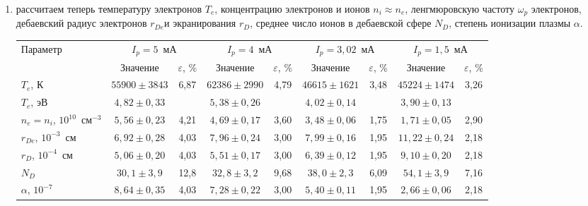 \documentclass[a4paper]{article}
\begin{document}
\begin{enumerate}
\item рассчитаем теперь температуру электронов $T_e$, концентрацию электронов и ионов $n_i \approx n_e$, ленгмюровскую частоту $\omega_p$ электронов, дебаевский радиус электронов $r_{De}$и экранирования $r_D$, среднее число ионов в дебаевской сфере $N_D$, степень ионизации плазмы $\alpha$.

\begin{table}[h!]
\centering

\label{tab:plasma_params}
\begin{tabular}{|l|c|c|c|c|c|c|c|c|}
\hline
\multirow{2}{*}{Параметр} & 
\multicolumn{2}{c|}{$I_p = 5$~мА} & 
\multicolumn{2}{c|}{$I_p = 4$~мА} & 
\multicolumn{2}{c|}{$I_p = 3,02$~мА} & 
\multicolumn{2}{c|}{$I_p = 1,5$~мА} \\
\cline{2-9}
& Значение & $\varepsilon$, \% & Значение & $\varepsilon$, \% & Значение & $\varepsilon$, \% & Значение & $\varepsilon$, \% \\
\hline

\multirow{2}{*}{$T_e$, К} & \multirow{2}{*}{$55900 \pm 3843$} & \multirow{2}{*}{6,87} & \multirow{2}{*}{$62386 \pm 2990$} & \multirow{2}{*}{4,79} & \multirow{2}{*}{$46615 \pm 1621$} & \multirow{2}{*}{3,48} & \multirow{2}{*}{$45224 \pm 1474$} & \multirow{2}{*}{3,26} \\
& & & & & & & & \\
\cline{1-1} \cline{2-9}

$T_e$, эВ & $4,82 \pm 0,33$ & & $5,38 \pm 0,26$ & & $4,02 \pm 0,14$ & & $3,90 \pm 0,13$ & \\
\hline

$n_e = n_i$, $10^{10}$~см$^{-3}$ & $5,56 \pm 0,23$ & 4,21 & $4,69 \pm 0,17$ & 3,60 & $3,48 \pm 0,06$ & 1,75 & $1,71 \pm 0,05$ & 2,90 \\
\hline

$r_{De}$, $10^{-3}$~см & $6,92 \pm 0,28$ & 4,03 & $7,96 \pm 0,24$ & 3,00 & $7,99 \pm 0,16$ & 1,95 & $11,22 \pm 0,24$ & 2,18 \\
\hline

$r_D$, $10^{-4}$~см & $5,06 \pm 0,20$ & 4,03 & $5,51 \pm 0,17$ & 3,00 & $6,39 \pm 0,12$ & 1,95 & $9,10 \pm 0,20$ & 2,18 \\
\hline

$N_D$ & $30,1 \pm 3,9$ & 12,8 & $32,8 \pm 3,2$ & 9,68 & $38,0 \pm 2,3$ & 6,09 & $54,1 \pm 3,9$ & 7,16 \\
\hline

$\alpha$, $10^{-7}$ & $8,64 \pm 0,35$ & 4,03 & $7,28 \pm 0,22$ & 3,00 & $5,40 \pm 0,11$ & 1,95 & $2,66 \pm 0,06$ & 2,18 \\
\hline


\end{tabular}
\end{table}
\end{enumerate}
\end{document}
